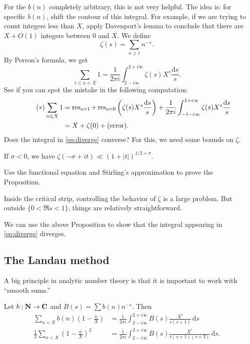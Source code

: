 For the $b(n)$ completely arbitrary, this is not very helpful. The idea is: for 
specific $b(n)$, shift the contour of this integral. For example, if we are 
trying to count integers less than $X$, apply Davenport's lemma to conclude 
that there are $X+O(1)$ integers between $0$ and $X$. We define 
\[
  \zeta(s) = \sum_{n\geqslant 1} n^{-s} .
\]
By Perron's formula, we get 
\[
  \sum_{1\leqslant n<X} 1 = \frac{1}{2\pi i} \int_{2-i\infty}^{2+i\infty} \zeta(s) X^s\frac{\mathrm{d}s}{s} .
\]
See if you can spot the mistake in the following computation: 
\begin{align*}\tag{$\ast$}\label{eq:diverge}
  \sum_{n\leqslant X} 1 
    &= \operatorname{res}_{s=1} + \operatorname{res}_{s=0}\left(\zeta(s)X^s\frac{\mathrm{d}s}{s}\right) + \frac{1}{2\pi i}\int_{-1-i\infty}^{1+i\infty} \zeta(s) X^s\frac{\mathrm{d}s}{s} \\
    &= X+\zeta(0) + (\text{error}) .
\end{align*}
Does the integral in \eqref{eq:diverge} converse? For this, we need some bounds 
on $\zeta$. 

\begin{prop}
If $\sigma<0$, we have $\zeta(-\sigma+i t) \ll (1+|t|)^{1/2+\sigma}$. 
\end{prop}

\begin{exercise}
Use the functional equation and Stirling's approximation to prove the 
Proposition. 
\end{exercise}

Inside the critical strip, controlling the behavior of $\zeta$ is a large 
problem. But outside $\{0<\Re s<1\}$, things are relatively straightforward. 

We can use the above Proposition to show that the integral appearing in 
\eqref{eq:diverge} diverges. 





\subsection{The Landau method}

A big principle in analytic number theory is that it is important to work with 
``smooth sums.'' 

\begin{prop}
Let $b:\mathbf{N}\to \mathbf{C}$ and $B(s)=\sum b(n) n^{-s}$. Then 
\begin{align*}
  \sum_{n<X} b(n)\left(1-\frac n X\right) &= \frac{1}{2\pi i} \int_{2-i\infty}^{2+i\infty} B(s) \frac{X^s}{s(s+1)}\, \mathrm{d}s \\
  \frac 1 2\sum_{n<X}\left(1-\frac n X\right)^2 &= \frac{1}{2\pi i}\int_{2-i\infty}^{2+i\infty} B(s) \frac{X^s}{s(s+1)(s+2)}\, \mathrm{d} s.
\end{align*}
\end{prop}

